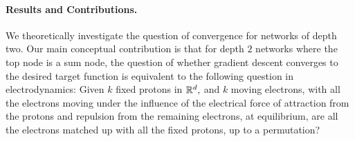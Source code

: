 \paragraph{Results and Contributions.} 
We theoretically investigate the question of convergence for networks of depth two.
Our main conceptual contribution is that for depth $2$ networks where the top node is a sum node, the question of whether gradient descent converges to the desired target function is equivalent to the following question in electrodynamics: Given $k$ fixed protons in $\mathbb R^d,$ and $k$ moving electrons,
with all the electrons moving under the influence of the 
electrical force of attraction from the protons and repulsion from the remaining electrons,
at equilibrium, are all the electrons matched up with all the fixed protons, up to a permutation?  

